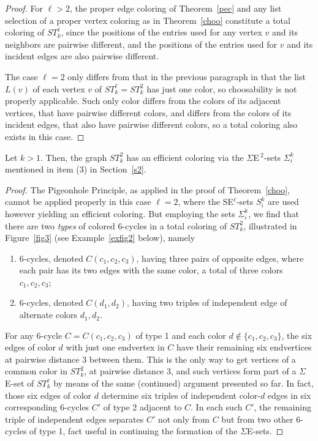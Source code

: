 \documentclass[12pt,reqno]{article}
\begin{document}
\begin{proof} For $\ell>2$,
the proper edge coloring of Theorem~\ref{pec} and any list selection of a proper vertex coloring as in Theorem~\ref{choo} constitute a total coloring of $ST_k^\ell$, since the positions of the entries used for any vertex $v$ and its neighbors are pairwise different, and the positions of the entries used for $v$ and its incident edges are also pairwise different. 

The case $\ell=2$ only differs from that in the previous paragraph in that the list $L(v)$ of each vertex $v$ of $ST_k^\ell=ST_k^2$ has just one color, so choosability is not properly applicable. Such only color differs from the colors of its adjacent vertices, that have pairwise different colors, and differs from the colors of its incident edges, that also have pairwise different colors, so a total coloring also exists in this case.
\end{proof}

\begin{theorem}\label{teofig2}
Let $k>1$. Then, the graph $ST_k^2$ has an efficient coloring via the $\Sigma$E$\,^2$-sets $\Sigma_i^k$ mentioned in item (3) in Section~\ref{s2}.
\end{theorem}

\begin{proof}
The Pigeonhole Principle, as applied in the proof of Theorem~\ref{choo}, cannot be applied properly in this case $\ell=2$, where the SE$^\ell$-sets $S_i^k$ are used however yielding an efficient coloring. But employing the sets $\Sigma_i^k$, we find that there are two {\it types} of colored 6-cycles in a total coloring of $ST_k^2$, illustrated in Figure~\ref{fig3} (see Example~\ref{exfig2} below), namely
\begin{enumerate}
\item 6-cycles, denoted $C(c_1,c_2,c_3)$, having three pairs of opposite edges, where each pair has its two edges with the same color, a total of three colors $c_1,c_2,c_3$;
\item 6-cycles, denoted $C(d_1,d_2)$, having two triples of independent edge of alternate colors $d_1,d_2$.
\end{enumerate}
For any 6-cycle $C=C(c_1,c_2,c_3)$ of type 1 and each color $d\notin\{c_1,c_2,c_3\}$, the six edges of color $d$ with just one endvertex in $C$ have their remaining six endvertices at pairwise distance 3 between them. This is the only way to get vertices of a common color in $ST_k^2$, at pairwise distance 3, and such vertices form part of a $\Sigma$E-set of $ST_k^\ell$ by means of the same (continued) argument presented so far. In fact, those six edges of color $d$ determine six triples of independent color-$d$ edges in six corresponding 6-cycles $C'$ of type 2 adjacent to $C$. In each such $C'$, the remaining triple of independent edges separates $C'$ not only from $C$ but from two other 6-cycles of type 1, fact useful in continuing the formation of the $\Sigma$E-sets.    
\end{proof}
\end{document}
